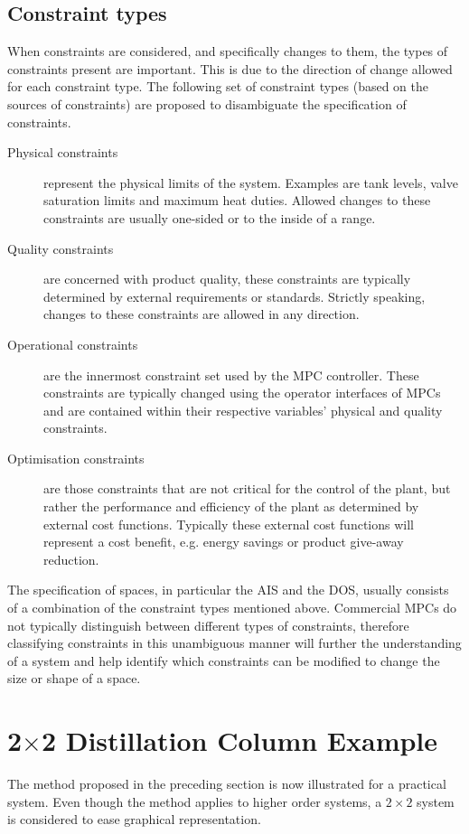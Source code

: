 \documentclass[final,authoryear,5pt,times,twocolumn]{elsarticle}
\begin{document}
\subsection{Constraint types}\label{sec:contypes}
When constraints are considered, and specifically changes to them, the types of constraints present are important.
This is due to the direction of change allowed for each constraint type.
The following set of constraint types (based on the sources of constraints) are proposed to disambiguate the specification of constraints.
\begin{description}
  \item [Physical constraints] represent the physical limits of the system.
  Examples are tank levels, valve saturation limits and maximum heat duties.
  Allowed changes to these constraints are usually one-sided or to the inside of a range.
  \item [Quality constraints] are concerned with product quality, these constraints are typically determined by external requirements or standards.
  Strictly speaking, changes to these constraints are allowed in any direction.
  \item [Operational constraints] are the innermost constraint set used by the MPC controller.
  These constraints are typically changed using the operator interfaces of MPCs and are contained within their respective variables' physical and quality constraints.
  \item [Optimisation constraints] are those constraints that are not critical for the control of the plant, but rather the performance and efficiency of the plant as determined by external cost functions.
  Typically these external cost functions will represent a cost benefit, e.g. energy savings or product give-away reduction.
\end{description}

The specification of spaces, in particular the AIS and the DOS, usually consists of a combination of the constraint types mentioned above.
Commercial MPCs do not typically distinguish between different types of constraints, therefore classifying constraints in this unambiguous manner will further the understanding of a system and help identify which constraints can be modified to change the size or shape of a space.


\section{2$\times$2 Distillation Column Example}\label{sec:dist}
The method proposed in the preceding section is now illustrated for a practical system.
Even though the method applies to higher order systems, a $2 \times 2$ system is considered to ease graphical representation.
\end{document}

